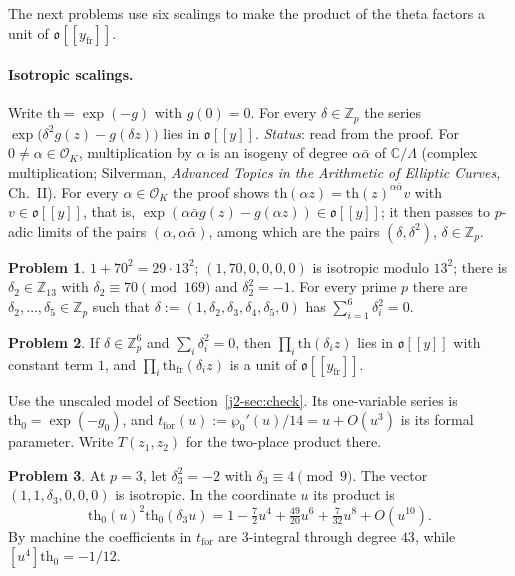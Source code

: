 \documentclass[reqno]{amsart}
\theoremstyle{definition}
\newtheorem{problem}{Problem}[section]
\theoremstyle{plain}
\newcommand{\Z}{\mathbb{Z}}
\newcommand{\C}{\mathbb{C}}
\newcommand{\Oc}{\mathcal{O}}
\newcommand{\tth}{\mathrm{th}}
\newcommand{\thfr}{\mathrm{th}_{\mathrm{fr}}}
\newcommand{\oo}{\mathfrak o}
\begin{document}
The next problems use six scalings to make the product of the theta factors a unit of \(\oo[[y_{\mathrm{fr}}]]\).

\paragraph{Isotropic scalings.}  Write \(\tth = \exp(-g)\) with \(g(0) = 0\).  For every \(\delta \in \Z_p\) the series \(\exp\bigl(\delta^2 g(z) - g(\delta z)\bigr)\) lies in \(\oo[[y]]\).  \emph{Status}: read from the proof.  For \(0 \ne \alpha \in \Oc_K\), multiplication by \(\alpha\) is an isogeny of degree \(\alpha\bar\alpha\) of \(\C/\Lambda\) (complex multiplication; Silverman, \emph{Advanced Topics in the Arithmetic of Elliptic Curves}, Ch.~II).  For every \(\alpha \in \Oc_K\) the proof shows \(\tth(\alpha z) = \tth(z)^{\alpha\bar\alpha}v\) with \(v \in \oo[[y]]\), that is, \(\exp(\alpha\bar\alpha g(z) - g(\alpha z)) \in \oo[[y]]\); it then passes to \(p\)-adic limits of the pairs \((\alpha, \alpha\bar\alpha)\), among which are the pairs \((\delta, \delta^2)\), \(\delta \in \Z_p\).

\begin{problem}\label{pr:isotropic}
\(1 + 70^2 = 29\cdot 13^2\); \((1, 70, 0, 0, 0, 0)\) is isotropic modulo \(13^2\); there is \(\delta_2 \in \Z_{13}\) with \(\delta_2 \equiv 70 \pmod{169}\) and \(\delta_2^2 = -1\).  For every prime \(p\) there are \(\delta_2, \dots, \delta_5 \in \Z_p\) such that \(\delta := (1, \delta_2, \delta_3, \delta_4, \delta_5, 0)\) has \(\sum_{i=1}^6 \delta_i^2 = 0\).
\end{problem}

\begin{problem}\label{pr:unit-inverse}
If \(\delta \in \Z_p^6\) and \(\sum_i\delta_i^2 = 0\), then \(\prod_{i}\tth(\delta_i z)\) lies in \(\oo[[y]]\) with constant term \(1\), and \(\prod_i \thfr(\delta_i z)\) is a unit of \(\oo[[y_{\mathrm{fr}}]]\).
\end{problem}

Use the unscaled model of Section~\ref{j2-sec:check}.  Its one-variable series is \(\mathrm{th}_0=\exp(-g_0)\), and \(t_{\mathrm{for}}(u):=\wp_0'(u)/14=u+O(u^3)\) is its formal parameter.  Write \(T(z_1,z_2)\) for the two-place product there.

\begin{problem}\label{pr:isotropic-three}
At \(p=3\), let \(\delta_3^2=-2\) with \(\delta_3\equiv4\pmod 9\).  The vector \((1,1,\delta_3,0,0,0)\) is isotropic.  In the coordinate \(u\) its product is
\[
  \mathrm{th}_0(u)^2\mathrm{th}_0(\delta_3 u)
    =1-\tfrac72 u^4+\tfrac{49}{20}u^6+\tfrac7{32}u^8+O(u^{10}).
\]
By machine the coefficients in \(t_{\mathrm{for}}\) are \(3\)-integral through degree \(43\), while \([u^4]\mathrm{th}_0=-1/12\).
\end{problem}
\end{document}
